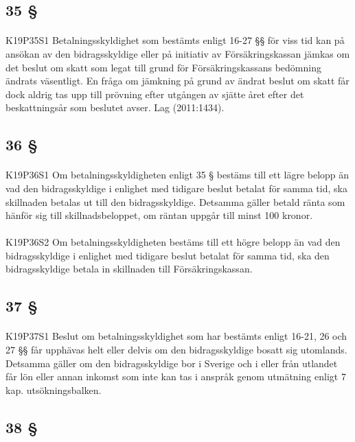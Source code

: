 \documentclass[a4paper,notitlepage,openany,10pt]{book}
\begin{document}
\subsection*{35 §}
\paragraph*{}
{\tiny K19P35S1}
Betalningsskyldighet som bestämts enligt 16-27 §§ för viss tid kan på ansökan av den bidragsskyldige eller på initiativ av Försäkringskassan jämkas om det beslut om skatt som legat till grund för Försäkringskassans bedömning ändrats väsentligt. En fråga om jämkning på grund av ändrat beslut om skatt får dock aldrig tas upp till prövning efter utgången av sjätte året efter det beskattningsår som beslutet avser.
Lag (2011:1434).
\subsection*{36 §}
\paragraph*{}
{\tiny K19P36S1}
Om betalningsskyldigheten enligt 35 § bestäms till ett lägre belopp än vad den bidragsskyldige i enlighet med tidigare beslut betalat för samma tid, ska skillnaden betalas ut till den bidragsskyldige. Detsamma gäller betald ränta som hänför sig till skillnadsbeloppet, om räntan uppgår till minst 100 kronor.
\paragraph*{}
{\tiny K19P36S2}
Om betalningsskyldigheten bestäms till ett högre belopp än vad den bidragsskyldige i enlighet med tidigare beslut betalat för samma tid, ska den bidragsskyldige betala in skillnaden till Försäkringskassan.
\subsection*{37 §}
\paragraph*{}
{\tiny K19P37S1}
Beslut om betalningsskyldighet som har bestämts enligt 16-21, 26 och 27 §§ får upphävas helt eller delvis om den bidragsskyldige bosatt sig utomlands. Detsamma gäller om den bidragsskyldige bor i Sverige och i eller från utlandet får lön eller annan inkomst som inte kan tas i anspråk genom utmätning enligt 7 kap. utsökningsbalken.
\subsection*{38 §}
\end{document}
